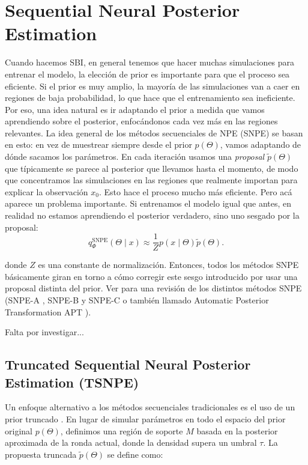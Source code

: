 \section{Sequential Neural Posterior Estimation}

Cuando hacemos SBI, en general tenemos que hacer muchas simulaciones para entrenar el modelo, la elección de prior es importante para que el proceso sea eficiente. Si el prior es muy amplio, la mayoría de las simulaciones van a caer en regiones de baja probabilidad, lo que hace que el entrenamiento sea ineficiente. Por eso, una idea natural es ir adaptando el prior a medida que vamos aprendiendo sobre el posterior, enfocándonos cada vez más en las regiones relevantes. La idea general de los métodos secuenciales de NPE (SNPE) se basan en esto: en vez de muestrear siempre desde el prior $p(\Theta)$, vamos adaptando de dónde sacamos los parámetros. En cada iteración usamos una \textit{proposal} $\tilde{p}(\Theta)$ que típicamente se parece al posterior que llevamos hasta el momento, de modo que concentramos las simulaciones en las regiones que realmente importan para explicar la observación $x_0$. Esto hace el proceso mucho más eficiente. Pero acá aparece un problema importante. Si entrenamos el modelo igual que antes, en realidad no estamos aprendiendo el posterior verdadero, sino uno sesgado por la proposal:
\[
q_\Phi^{\text{SNPE}}(\Theta \mid x) \approx \frac{1}{Z} p(x \mid \Theta)\tilde{p}(\Theta).
\]

donde $Z$ es una constante de normalización. Entonces, todos los métodos SNPE básicamente giran en torno a cómo corregir este sesgo introducido por usar una proposal distinta del prior. Ver \cite{greenberg2019} para una revisión de los distintos métodos SNPE (SNPE-A \cite{papamakarios2018fastepsilon}, SNPE-B y SNPE-C  o también llamado Automatic Posterior Transformation APT \cite{greenberg2019}).

Falta por investigar...

\subsection{Truncated Sequential Neural Posterior Estimation (TSNPE)}
Un enfoque alternativo a los métodos secuenciales tradicionales es el uso de un prior truncado \cite{deistler2022}. En lugar de simular parámetros en todo el espacio del prior original $p(\Theta)$, definimos una región de soporte $M$ basada en la posterior aproximada de la ronda actual, donde la densidad supera un umbral $\tau$. La propuesta truncada $\tilde{p}(\Theta)$ se define como:

